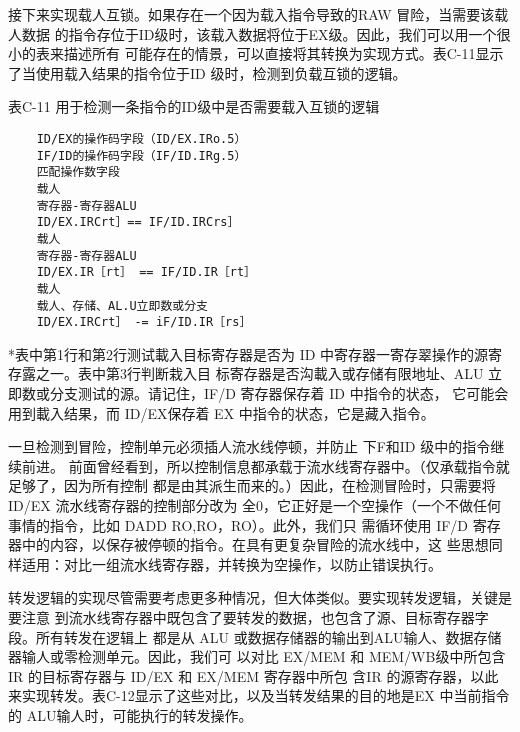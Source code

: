 接下来实现载人互锁。如果存在一个因为载入指令导致的RAW 冒险，当需要该载人数据
的指令存位于ID级时，该载入数据将位于EX级。因此，我们可以用一个很小的表来描述所有
可能存在的情景，可以直接将其转换为实现方式。表C-11显示了当使用载入结果的指令位于ID
级时，检测到负载互锁的逻辑。

表C-11 用于检测一条指令的ID级中是否需要载入互锁的逻辑
\begin{verbatim}
    ID/EX的操作码字段（ID/EX.IRo.5）
    IF/ID的操作码字段（IF/ID.IRg.5）
    匹配操作数字段
    载人
    寄存器-寄存器ALU
    ID/EX.IRCrt］== IF/ID.IRCrs］
    载人
    寄存器-寄存器ALU
    ID/EX.IR［rt］ == IF/ID.IR［rt］
    载人
    载人、存储、AL.U立即数或分支
    ID/EX.IRCrt］ -= iF/ID.IR［rs］
\end{verbatim}
*表中第1行和第2行测试載入目标寄存器是否为 ID 中寄存器一寄存翠操作的源寄存露之一。表中第3行判断栽入目
标寄存器是否沟載入或存储有限地址、ALU 立即数或分支测试的源。请记住，IF/D 寄存器保存着 ID 中指令的状态，
它可能会用到載入结果，而 ID/EX保存着 EX 中指令的状态，它是藏入指令。

一旦检测到冒险，控制单元必须插人流水线停顿，并防止 下F和ID 级中的指令继续前进。
前面曾经看到，所以控制信息都承载于流水线寄存器中。（仅承载指令就足够了，因为所有控制
都是由其派生而来的。）因此，在检测冒险时，只需要将 ID/EX 流水线寄存器的控制部分改为
全0，它正好是一个空操作（一个不做任何事情的指令，比如 DADD RO,RO，RO）。此外，我们只
需循环使用 IF/D 寄存器中的内容，以保存被停顿的指令。在具有更复杂冒险的流水线中，这
些思想同样适用：对比一组流水线寄存器，并转换为空操作，以防止错误执行。

转发逻辑的实现尽管需要考虑更多种情况，但大体类似。要实现转发逻辑，关键是要注意
到流水线寄存器中既包含了要转发的数据，也包含了源、目标寄存器字段。所有转发在逻辑上
都是从 ALU 或数据存储器的输出到ALU输人、数据存储器输人或零检测单元。因此，我们可
以对比 EX/MEM 和 MEM/WB级中所包含IR 的目标寄存器与 ID/EX 和 EX/MEM 寄存器中所包
含IR 的源寄存器，以此来实现转发。表C-12显示了这些对比，以及当转发结果的目的地是EX
中当前指令的 ALU输人时，可能执行的转发操作。

